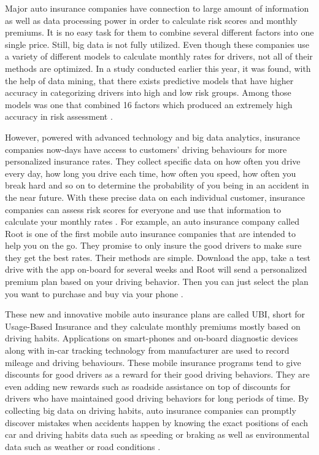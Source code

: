 Major auto insurance companies have connection to large amount of information as well as data processing power in order to calculate risk scores and monthly premiums. It is no easy task for them to combine several different factors into one single price. Still, big data is not fully utilized. Even though these companies use a variety of different models to calculate monthly rates for drivers, not all of their methods are optimized. In a study conducted earlier this year, it was found, with the help of data mining, that there exists predictive models that have higher accuracy in categorizing drivers into high and low risk groups. Among those models was one that combined 16 factors which produced an extremely high accuracy in risk assessment \cite{Rippe2017unfair}.

However, powered with advanced technology and big data analytics, insurance companies now-days have access to customers' driving behaviours for more personalized insurance rates. They collect specific data on how often you drive every day, how long you drive each time, how often you speed, how often you break hard and so on to determine the probability of you being in an accident in the near future. With these precise data on each individual customer, insurance companies can assess risk scores for everyone and use that information to calculate your monthly rates \cite{Fung2016turn}. For example, an auto insurance company called Root is one of the first mobile auto insurance companies that are intended to help you on the go. They promise to only insure the good drivers to make sure they get the best rates. Their methods are simple. Download the app, take a test drive with the app on-board for several weeks and Root will send a personalized premium plan based on your driving behavior. Then you can just select the plan you want to purchase and buy via your phone \cite{Rippe2017unfair}.

These new and innovative mobile auto insurance plans are called UBI, short for Usage-Based Insurance and they calculate monthly premiums mostly based on driving habits. Applications on smart-phones and on-board diagnostic devices along with in-car tracking technology from manufacturer are used to record mileage and driving behaviours. 
These mobile insurance programs tend to give discounts for good drivers as a reward for their good driving behaviors. They are even adding new rewards such as roadside assistance on top of discounts for drivers who have maintained good driving behaviors for long periods of time. By collecting big data on driving habits, auto insurance companies can promptly discover mistakes when accidents happen by knowing the exact positions of each car and driving habits data such as speeding or braking as well as environmental data such as weather or road conditions \cite{Shafer2016industry}.


